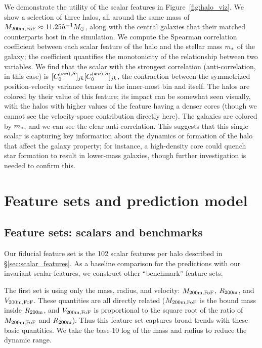 We demonstrate the utility of the scalar features in Figure~\ref{fig:halo_viz}.
We show a selection of three \dark halos, all around the same mass of $M_\mathrm{200m,FoF} \approx 11.25 h^{-1} M_\mathrm{\odot}$, along with the central galaxies that their matched counterparts host in the \hydro simulation.
We compute the Spearman correlation coefficient between each scalar feature of the halo and the stellar mass $m_*$ of the galaxy; the coefficient quantifies the monotonicity of the relationship between two variables.
We find that the scalar with the strongest correlation (anti-correlation, in this case) is $[C^{(\bm{x}\bm{v}),S}_0]_{jk} [C^{(\bm{x}\bm{v}),S}_0]_{jk}$, the contraction between the symmetrized position-velocity variance tensor in the inner-most bin and itself.
The halos are colored by their value of this feature; its impact can be somewhat seen visually, with the halos with higher values of the feature having a denser cores (though we cannot see the velocity-space contribution directly here).
The galaxies are colored by $m_*$, and we can see the clear anti-correlation.
This suggests that this single scalar is capturing key information about the dynamics or formation of the halo that affect the galaxy property; for instance, a high-density core could quench star formation to result in lower-mass galaxies, though further investigation is needed to confirm this.


\section{Feature sets and prediction model}
\label{sec:features_model}

\subsection{Feature sets: scalars and benchmarks}
\label{sec:features}

Our fiducial feature set is the 102 scalar features per halo described in \S\ref{sec:scalar_features}.
As a baseline comparison for the predictions with our invariant scalar features, we construct other ``benchmark'' feature sets.

The first set is using only the mass, radius, and velocity: $M_\mathrm{200m,FoF}$, $R_\mathrm{200m}$, and $V_\mathrm{200m,FoF}$. 
These quantities are all directly related ($M_\mathrm{200m,FoF}$ is the bound mass inside $R_\mathrm{200m}$, and $V_\mathrm{200m,FoF}$ is proportional to the square root of the ratio of $M_\mathrm{200m,FoF}$ and $R_\mathrm{200m}$).
Thus this feature set captures broad trends with these basic quantities.
We take the base-10 log of the mass and radius to reduce the dynamic range.

